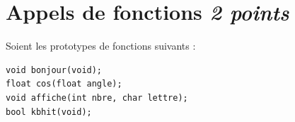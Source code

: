 
\section{Appels de fonctions \hfill \textit{2 points}}

Soient les prototypes de fonctions suivants :
\begin{lstlisting}
void bonjour(void);
float cos(float angle);
void affiche(int nbre, char lettre);
bool kbhit(void);
\end{lstlisting}


\espaceReponse{6cm}
